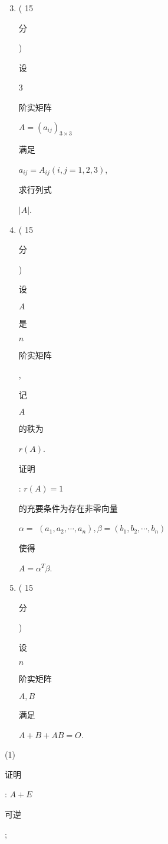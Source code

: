 \documentclass[10pt]{article}
\begin{document}
\begin{enumerate}
  \setcounter{enumi}{2}
  \item ( 15 \begin{CJK}{UTF8}{mj}分\end{CJK}) \begin{CJK}{UTF8}{mj}设\end{CJK} 3 \begin{CJK}{UTF8}{mj}阶实矩阵\end{CJK} $A=\left(a_{i j}\right)_{3 \times 3}$ \begin{CJK}{UTF8}{mj}满足\end{CJK} $a_{i j}=A_{i j}(i, j=1,2,3)$, \begin{CJK}{UTF8}{mj}求行列式\end{CJK} $|A|$.

  \item ( 15 \begin{CJK}{UTF8}{mj}分\end{CJK}) \begin{CJK}{UTF8}{mj}设\end{CJK} $A$ \begin{CJK}{UTF8}{mj}是\end{CJK} $n$ \begin{CJK}{UTF8}{mj}阶实矩阵\end{CJK}, \begin{CJK}{UTF8}{mj}记\end{CJK} $A$ \begin{CJK}{UTF8}{mj}的秩为\end{CJK} $r(A)$. \begin{CJK}{UTF8}{mj}证明\end{CJK}: $r(A)=1$ \begin{CJK}{UTF8}{mj}的充要条件为存在非零向量\end{CJK} $\alpha=$ $\left(a_{1}, a_{2}, \cdots, a_{n}\right), \beta=\left(b_{1}, b_{2}, \cdots, b_{n}\right)$ \begin{CJK}{UTF8}{mj}使得\end{CJK} $A=\alpha^{T} \beta$.

  \item ( 15 \begin{CJK}{UTF8}{mj}分\end{CJK}) \begin{CJK}{UTF8}{mj}设\end{CJK} $n$ \begin{CJK}{UTF8}{mj}阶实矩阵\end{CJK} $A, B$ \begin{CJK}{UTF8}{mj}满足\end{CJK} $A+B+A B=O$.

\end{enumerate}
(1) \begin{CJK}{UTF8}{mj}证明\end{CJK}: $A+E$ \begin{CJK}{UTF8}{mj}可逆\end{CJK};
\end{document}
